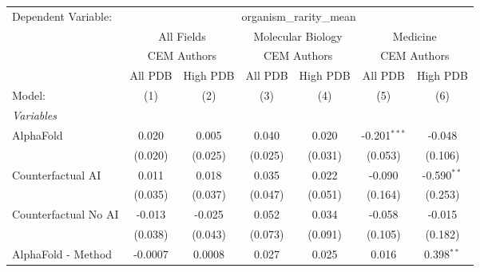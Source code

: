 \begingroup
\centering
\begin{tabular}{lcccccc}
   \tabularnewline \midrule \midrule
   Dependent Variable: & \multicolumn{6}{c}{organism\_rarity\_mean}\\
 & \multicolumn{2}{c}{All Fields} & \multicolumn{2}{c}{Molecular Biology} & \multicolumn{2}{c}{Medicine} \\
\cmidrule(lr){2-3} \cmidrule(lr){4-5} \cmidrule(lr){6-7}
 & \multicolumn{2}{c}{CEM Authors} & \multicolumn{2}{c}{CEM Authors} & \multicolumn{2}{c}{CEM Authors} \\
\cmidrule(lr){2-3} \cmidrule(lr){4-5} \cmidrule(lr){6-7}
 & \multicolumn{1}{c}{All PDB} & \multicolumn{1}{c}{High PDB} & \multicolumn{1}{c}{All PDB} & \multicolumn{1}{c}{High PDB} & \multicolumn{1}{c}{All PDB} & \multicolumn{1}{c}{High PDB} \\
\cmidrule(lr){2-2} \cmidrule(lr){3-3} \cmidrule(lr){4-4} \cmidrule(lr){5-5} \cmidrule(lr){6-6} \cmidrule(lr){7-7}
   Model:                                                     & (1)         & (2)           & (3)          & (4)          & (5)            & (6)\\  
   \midrule
   \emph{Variables}\\
   AlphaFold                                                  & 0.020       & 0.005         & 0.040        & 0.020        & -0.201$^{***}$ & -0.048\\   
                                                              & (0.020)     & (0.025)       & (0.025)      & (0.031)      & (0.053)        & (0.106)\\   
   Counterfactual AI                                          & 0.011       & 0.018         & 0.035        & 0.022        & -0.090         & -0.590$^{**}$\\   
                                                              & (0.035)     & (0.037)       & (0.047)      & (0.051)      & (0.164)        & (0.253)\\   
   Counterfactual No AI                                       & -0.013      & -0.025        & 0.052        & 0.034        & -0.058         & -0.015\\   
                                                              & (0.038)     & (0.043)       & (0.073)      & (0.091)      & (0.105)        & (0.182)\\   
   AlphaFold - Method                                         & -0.0007     & 0.0008        & 0.027        & 0.025        & 0.016          & 0.398$^{**}$\\   

\end{tabular}

